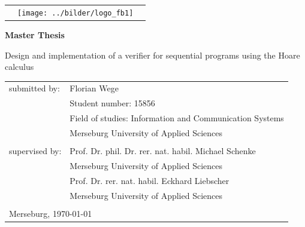



\renewcommand{\thetable}{T\arabic{table}}
\renewcommand{\thelstlisting}{L\arabic{lstlisting}}

\titlepage
\begin{titlepage}

\begin{center}
\begin{tabular}{ccc}
 & \multirow{1}{*}{\texttt{[image: ../bilder/logo\_fb1]}} & \tabularnewline
\end{tabular}
\par\end{center}

\vfill

\begin{center}
\textbf{\Large{}Master Thesis}
\par\end{center}{\Large \par}

\begin{center}
{\large{}Design and implementation of a verifier for sequential programs
using the Hoare calculus}
\par\end{center}{\large \par}

\begin{flushleft}
{\Large{}\vfill
}
\par\end{flushleft}{\Large \par}

\begin{tabular}{ll}
submitted by:\hspace{1cm} & Florian Wege\tabularnewline
 & Student number: 15856\tabularnewline
 & Field of studies: Information and Communication Systems\tabularnewline
 & Merseburg University of Applied Sciences\tabularnewline
 & \tabularnewline
supervised by: & Prof. Dr. phil. Dr. rer. nat. habil. Michael Schenke\tabularnewline
 & Merseburg University of Applied Sciences\tabularnewline
 & Prof. Dr. rer. nat. habil. Eckhard Liebscher\tabularnewline
 & Merseburg University of Applied Sciences\tabularnewline
 & \tabularnewline
\multicolumn{2}{l}{Merseburg, \today}\tabularnewline
\end{tabular}

\end{titlepage}

